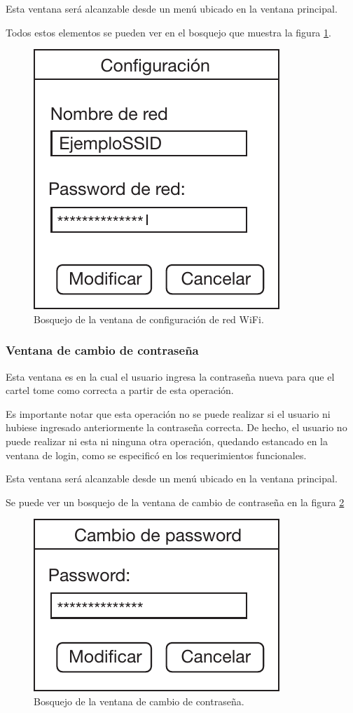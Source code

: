 Esta ventana será alcanzable desde un menú ubicado en la ventana principal.

Todos estos elementos se pueden ver en el bosquejo que muestra la figura \ref{fig:skgui-conf}.

\begin{figure}
	\centering
	\includegraphics[scale=0.8]{imagenes/skgui-conf.pdf}
	\caption{Bosquejo de la ventana de configuración de red WiFi.}
	\label{fig:skgui-conf}
\end{figure}

\subsubsection{Ventana de cambio de contraseña}
Esta ventana es en la cual el usuario ingresa la contraseña nueva para que el cartel tome como correcta a partir de esta operación.

Es importante notar que esta operación no se puede realizar si el usuario ni hubiese ingresado anteriormente la contraseña correcta. De hecho, el usuario no puede realizar ni esta ni ninguna otra operación, quedando estancado en la ventana de login, como se especificó en los requerimientos funcionales.

Esta ventana será alcanzable desde un menú ubicado en la ventana principal.

Se puede ver un bosquejo de la ventana de cambio de contraseña en la figura \ref{fig:skgui-passwd}

\begin{figure}
	\centering
	\includegraphics[scale=0.8]{imagenes/skgui-passwd.pdf}
	\caption{Bosquejo de la ventana de cambio de contraseña.}
	\label{fig:skgui-passwd}
\end{figure}


